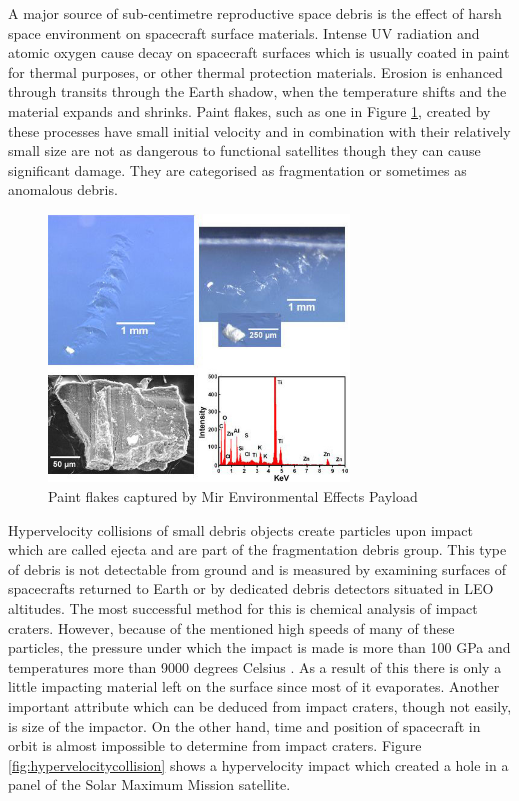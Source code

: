 	A major source of sub-centimetre reproductive space debris is the effect of harsh space environment on spacecraft surface materials. Intense UV radiation and atomic oxygen cause decay on spacecraft surfaces which is usually coated in paint for thermal purposes, or other thermal protection materials. Erosion is enhanced through transits through the Earth shadow, when the temperature shifts and the material expands and shrinks. Paint flakes, such as one in Figure \ref{fig:paintflakes}, created by these processes have small initial velocity and in combination with their relatively small size are not as dangerous to functional satellites though they can cause significant damage. They are categorised as fragmentation or sometimes as anomalous debris.
	
\begin{figure}[H]
	\centering
  \includegraphics[width=8cm]{images/paintflakes}
  \caption{Paint flakes captured by Mir Environmental Effects Payload}
  \label{fig:paintflakes}
\end{figure}
	
	Hypervelocity collisions of small debris objects create particles upon impact which are called ejecta and are part of the fragmentation debris group. This type of debris is not detectable from ground and is measured by examining surfaces of spacecrafts returned to Earth or by dedicated debris detectors situated in LEO altitudes. The most successful method for this is chemical analysis of impact craters. However, because of the mentioned high speeds of many of these particles, the pressure under which the impact is made is more than 100 GPa and temperatures more than 9000 degrees Celsius \citep{klinkrad2006space}. As a result of this there is only a little impacting material left on the surface since most of it evaporates. Another important attribute which can be deduced from impact craters, though not easily, is size of the impactor.  On the other hand, time and position of spacecraft in orbit is almost impossible to determine from impact craters. Figure \ref{fig:hypervelocitycollision} shows a hypervelocity impact which created a hole in a panel of the Solar Maximum Mission satellite.
	
